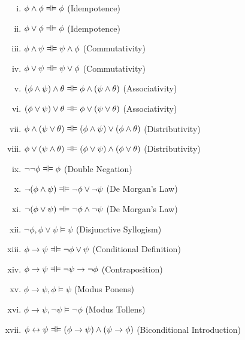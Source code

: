 \begin{enumerate}[\thesection.1]
\begin{lemma}
\begin{enumerate}[(i)]
				\item $\phi\land\phi\equi\phi$ \hfill (Idempotence)
				
				\item  $\phi\lor\phi\equi\phi$ \hfill (Idempotence)
				
				\item $\phi\land\psi\equi \psi\land\phi$ \hfill (Commutativity)
				\item $\phi\lor\psi\equi \psi\lor\phi$ \hfill (Commutativity)
				
				\item $(\phi\land\psi)\land\theta\equi \phi\land(\psi\land\theta)$ \hfill (Associativity)
				
				\item $(\phi\lor\psi)\lor\theta\equi \phi\lor(\psi\lor\theta)$ \hfill (Associativity)
			
				\item $\phi\land(\psi\lor\theta)\equi (\phi\land\psi)\lor(\phi\land\theta)$ \hfill (Distributivity)
				\item $\phi\lor(\psi\land\theta)\equi (\phi\lor\psi)\land(\phi\lor\theta)$ \hfill (Distributivity)
				
				\item $\neg\neg \phi\equi \phi$ \hfill (Double Negation)
				
				\item $\neg(\phi\land\psi)\equi \neg\phi\lor\neg\psi$ \hfill (De Morgan's Law)
				
				\item  $\neg(\phi\lor\psi)\equi \neg\phi\land\neg\psi$ \hfill (De Morgan's Law)
						
				\item $\neg\phi,\phi\lor \psi\vDash\psi$ \hfill (Disjunctive Syllogism)
				
				\item $\phi\to\psi\equi \neg\phi\lor\psi$ \hfill (Conditional Definition)
			
				\item $\phi\to\psi\equi\neg\psi\to\neg \phi$ \hfill (Contraposition)
				
				\item $\phi\to\psi,\phi\vDash\psi$ \hfill (Modus Ponens)
				
				\item $\phi\to\psi,\neg\psi\vDash\neg\phi$ \hfill (Modus Tollens)
				
				\item $\phi\leftrightarrow\psi\equi (\phi\to\psi)\land(\psi\to\phi)$ \hfill (Biconditional Introduction)
				

\end{enumerate}
\end{lemma}
\end{enumerate}
